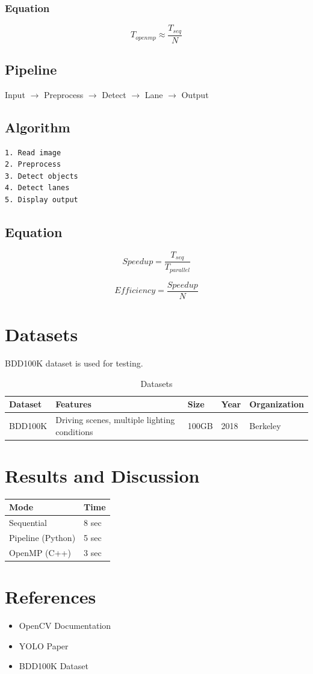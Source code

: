\documentclass[12pt]{report}
\begin{document}
\subsection*{Equation}
\[
T_{openmp} \approx \frac{T_{seq}}{N}
\]
\section*{Pipeline}
Input $\rightarrow$ Preprocess $\rightarrow$ Detect $\rightarrow$ Lane $\rightarrow$ Output

\section*{Algorithm}
\begin{verbatim}
1. Read image
2. Preprocess
3. Detect objects
4. Detect lanes
5. Display output
\end{verbatim}

\section{Equation}

\[
Speedup = \frac{T_{seq}}{T_{parallel}}
\]

\[
Efficiency = \frac{Speedup}{N}
\]

\chapter{Datasets}

BDD100K dataset is used for testing.
\renewcommand{\arraystretch}{1.3}
\begin{table}[h]
\centering
\begin{tabular}{|l|l|l|l|l|}
\hline
Dataset & Features & Size & Year & Organization \\ \hline
BDD100K & Driving scenes, multiple lighting conditions & 100GB & 2018 & Berkeley \\ \hline
\end{tabular}
\caption{Datasets}
\end{table}

\chapter{Results and Discussion}
\renewcommand{\arraystretch}{1.3}

\begin{tabular}{|l|l|}
\hline
Mode & Time \\ \hline
Sequential & 8 sec \\ \hline
Pipeline (Python) & 5 sec \\ \hline
OpenMP (C++) & 3 sec \\ \hline
\end{tabular}

\chapter{References}

\begin{itemize}
\item OpenCV Documentation
\item YOLO Paper
\item BDD100K Dataset
\end{itemize}
\end{document}

